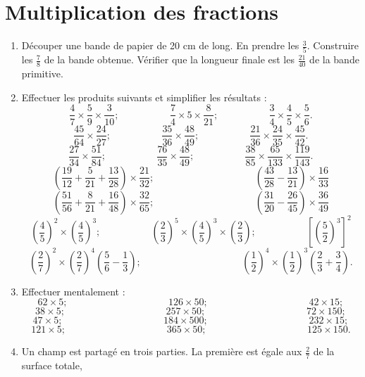 \chapter{Multiplication des fractions}
 
 \begin{enumerate}
 \item Découper une bande de papier de 20 cm de long. 
 En prendre les $\frac35$. Construire les $\frac78$ de la bande obtenue. Vérifier que la longueur finale est les $\frac{21}{40}$ de la bande primitive. 
 \item Effectuer les produits suivants et simplifier les résultats : 
 \[ \frac47\times \frac59\times \frac3{10}; 
 \phantom{meowmeow} \frac74\times5\times\frac8{21};
  \phantom{meowmeow}  \frac34\times \frac45\times \frac56.\] 
   \[ \frac{45}{64}\times\frac{24}{27}; 
 \phantom{meowmeow} \frac{35}{36}\times\frac{48}{49};
  \phantom{meowmeow}  \frac{21}{36}\times\frac{24}{35} \times \frac{45}{42}.\] 
   \[ \frac{27}{34}\times \frac{51}{84}; 
 \phantom{meowmeow} \frac{76}{35}\times\frac{48}{49};
  \phantom{meowmeow}  \frac{38}{85}\times \frac{65}{133} \times \frac{119}{143}.\] 
  \[ \left(\frac{19}{12} + \frac5{21} + \frac{13}{28}
   \right)\times\frac{21}{32}; \phantom{meowmeowmeowmeow}
   \left(\frac{43}{28}-\frac{13}{21}\right)\times 
   \frac{16}{33} \]
     \[ \left(\frac{51}{56} + \frac8{21} + \frac{16}{48}
   \right)\times\frac{32}{65}; \phantom{meowmeowmeowmeow}
   \left(\frac{31}{20}-\frac{26}{45}\right)\times 
   \frac{36}{49} \]
   \[ \left( \frac45\right)^2 \times \left(\frac45\right)^3; \phantom{meowmeow} 
   \left( \frac23\right)^5 \times \left(\frac45\right)^3\times \left(\frac23\right);
   \phantom{meowmeow} \left[\left(\frac52\right)^3\right]^2\]
   \[ \left(\frac27\right)^2 \times \left(\frac27\right)^4\left(\frac56-\frac13\right) ; 
    \phantom{meowmeowmeowmeow}
    \left(\frac12\right)^4 \times \left(\frac12\right)^3 \left(\frac23+\frac34\right).\]
 \item Effectuer mentalement : 
 \[ 62 \times 5;  \phantom{meowmeowmeowmeow}
 126 \times 50;  \phantom{meowmeowmeowmeow}
 42 \times 15;\]
  \[ 38 \times 5;  \phantom{meowmeowmeowmeow}
 257 \times 50;  \phantom{meowmeowmeowmeow}
 72 \times 150;\] \[ 47 \times 5;  \phantom{meowmeowmeowmeow}
 184 \times 500;  \phantom{meowmeowmeowmeow}
 232 \times 15;\] 
 \[ 121 \times 5;  \phantom{meowmeowmeowmeow}
 365 \times 50;  \phantom{meowmeowmeowmeow}
 125 \times 150.\]
 \item Un champ est partagé en trois parties. La première est égale aux $\frac27$ de la surface totale,

\end{enumerate}
